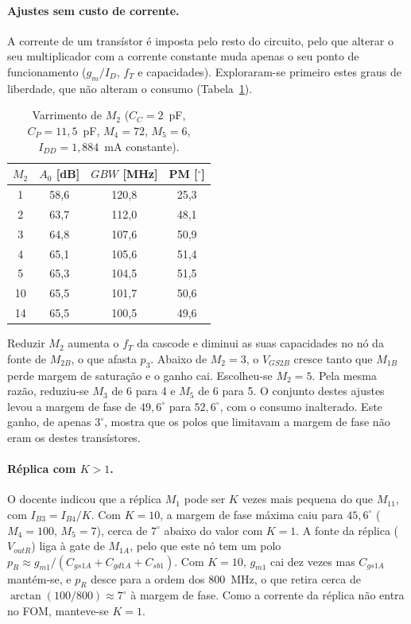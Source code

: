 \paragraph{Ajustes sem custo de corrente.}
A corrente de um transístor é imposta pelo resto do circuito, pelo que alterar o seu multiplicador com a corrente
constante muda apenas o seu ponto de funcionamento ($g_m/I_D$, $f_T$ e capacidades). Exploraram-se primeiro estes graus
de liberdade, que não alteram o consumo (Tabela~\ref{tab:iter_m2}).

\begin{table}[H]
    \centering
    \caption{Varrimento de $M_2$ ($C_C = 2$~pF, $C_P = 11{,}5$~pF, $M_4 = 72$, $M_5 = 6$, $I_{DD} = 1{,}884$~mA constante).}
    \label{tab:iter_m2}
    \begin{tabular}{cccc}
        \toprule
        $M_2$ & $A_0$ [dB] & $GBW$ [MHz] & PM [$^\circ$] \\
        \midrule
        1  & 58,6 & 120,8 & 25,3 \\
        2  & 63,7 & 112,0 & 48,1 \\
        3  & 64,8 & 107,6 & 50,9 \\
        4  & 65,1 & 105,6 & 51,4 \\
        5  & 65,3 & 104,5 & 51,5 \\
        10 & 65,5 & 101,7 & 50,6 \\
        14 & 65,5 & 100,5 & 49,6 \\
        \bottomrule
    \end{tabular}
\end{table}

Reduzir $M_2$ aumenta o $f_T$ da cascode e diminui as suas capacidades no nó da fonte de $M_{2B}$, o que afasta $p_3$.
Abaixo de $M_2 = 3$, o $V_{GS2B}$ cresce tanto que $M_{1B}$ perde margem de saturação e o ganho cai. Escolheu-se
$M_2 = 5$. Pela mesma razão, reduziu-se $M_3$ de 6 para 4 e $M_5$ de 6 para 5. O conjunto destes ajustes levou a margem
de fase de $49{,}6^\circ$ para $52{,}6^\circ$, com o consumo inalterado. Este ganho, de apenas $3^\circ$, mostra que
os polos que limitavam a margem de fase não eram os destes transístores.

\paragraph{Réplica com $K > 1$.}
O docente indicou que a réplica $M_1$ pode ser $K$ vezes mais pequena do que $M_{11}$, com $I_{B3} = I_{B4}/K$. Com
$K = 10$, a margem de fase máxima caiu para $45{,}6^\circ$ ($M_4 = 100$, $M_5 = 7$), cerca de $7^\circ$ abaixo do valor
com $K = 1$. A fonte da réplica ($V_{outR}$) liga à gate de $M_{1A}$, pelo que este nó tem um polo
$p_R \approx g_{m1}/(C_{gs1A} + C_{gd1A} + C_{sb1})$. Com $K = 10$, $g_{m1}$ cai dez vezes mas $C_{gs1A}$ mantém-se, e
$p_R$ desce para a ordem dos 800~MHz, o que retira cerca de $\arctan(100/800) \approx 7^\circ$ à margem de fase. Como
a corrente da réplica não entra no FOM, manteve-se $K = 1$.


